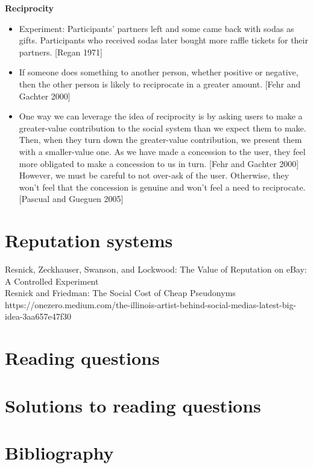 \documentclass[class=book, crop=false]{standalone}
\providecommand{\keyterm}[1]{\textbf{#1}\marginnote{\scriptsize \textbf{#1}}}
\begin{document}
\keyterm{Reciprocity}
\begin{itemize}
    \item Experiment: Participants’ partners left and some came back with sodas as gifts. Participants who received sodas later bought more raffle tickets for their partners. [Regan 1971]
    \item If someone does something to another person, whether positive or negative, then the other person is likely to reciprocate in a greater amount. [Fehr and Gachter 2000]
    \item One way we can leverage the idea of reciprocity is by asking users to make a greater-value contribution to the social system than we expect them to make. Then, when they turn down the greater-value contribution, we present them with a smaller-value one. As we have made a concession to the user, they feel more obligated to make a concession to us in turn. [Fehr and Gachter 2000] However, we must be careful to not over-ask of the user. Otherwise, they won't feel that the concession is genuine and won't feel a need to reciprocate. [Pascual and Gueguen 2005]
\end{itemize}

\section{Reputation systems}

Resnick, Zeckhauser, Swanson, and Lockwood: The Value of Reputation on eBay: A Controlled Experiment\\

Resnick and Friedman: The Social Cost of Cheap Pseudonyms\\

https://onezero.medium.com/the-illinois-artist-behind-social-medias-latest-big-idea-3aa657e47f30

\section{Reading questions}

\section{Solutions to reading questions}

\section{Bibliography}
\end{document}
